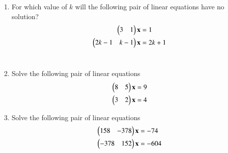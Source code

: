 \begin{enumerate}[label=\arabic*.,ref=\thesubsection.\theenumi]
\item For which value of $k$ will the following pair of linear equations have no solution?
\begin{align}
\begin{split}
\begin{pmatrix}3 & 1 \end{pmatrix}\mathbf{x}&=1
\\
\begin{pmatrix}2k-1 & k-1 \end{pmatrix}\mathbf{x}&=2k+1
\end{split}
\end{align}
\\
\solution

\item Solve the following pair of linear equations
\begin{align}
\begin{split}
\begin{pmatrix}8 & 5 \end{pmatrix}\mathbf{x}&=9
\\
\begin{pmatrix}3 & 2 \end{pmatrix}\mathbf{x}&=4
\end{split}
\end{align}
\solution 

%
\item Solve the following pair of linear equations
\begin{align}
\begin{split}
\begin{pmatrix}158 & -378 \end{pmatrix}\mathbf{x}&=-74
\\
\begin{pmatrix}-378 & 152 \end{pmatrix}\mathbf{x}&=-604
\end{split}
\end{align}


\end{enumerate}
